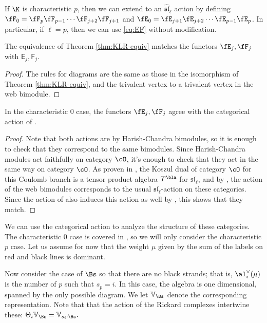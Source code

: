 If $\K$ is characteristic $p$, then we can extend to an
$\mathfrak{\widehat{sl}}_\ell$ action by defining
$\fF_0=\fF_{p}\fF_{p-1}\cdots \fF_{j+2}\fF_{j+1}$ and
$\fE_0=\fE_{j+1}\fE_{j+2}\cdots \fE_{p-1}\fE_{p}$.  In particular, if
$\ell=p$, then we can use \eqref{eq:EF} without modification.

\begin{proposition}
  The equivalence of Theorem \ref{thm:KLR-equiv} matches the functors
  $\fE_j,\fF_j$ with $\mathsf{E}_j,\mathsf{F}_j$.
\end{proposition}
\begin{proof}
  The rules for diagrams are the same as those in the isomorphism of
  Theorem \ref{thm:KLR-equiv}, and the trivalent vertex to a trivalent
  vertex in the web bimodule.
\end{proof}
\begin{proposition}\label{prop:char-0-match}
  In the characteristic 0 case, the functors $\fE_j,\fF_j$ agree with
  the categorical action of \cite{Webcatq}.  
\end{proposition}
\begin{proof}
Note that both actions are by Harish-Chandra bimodules, so it is
enough to check that they correspond to the same bimodules.  Since
Harish-Chandra modules act faithfully on category $\cO$, it's enough
to check that they act in the same way on category $\cO$.  As proven
in \cite{WebSD}, the Koszul dual of category $\cO$ for this Coulomb
branch is a tensor
  product algebra $T^\bla$ for $\mathfrak{sl}_\ell$, and by \cite{Webweb}, the action of the
  web bimodules corresponds to the usual $\mathfrak{sl}_\ell$-action
  on these categories.  Since the action of \cite{Webcatq} also
  induces this action as well by \cite{Webqui}, this shows that they match.
\end{proof}


We can use the categorical action to analyze the structure of these
categories.  The characteristic 0 case is covered in \cite{WebSD}, so
we will only consider the characteristic $p$ case.  
Let us assume for now that the weight $\mu$ given by the sum of the
labels on red and black lines is dominant.  

Now consider the case of $\Bs$ so that there are no black strands; that is, $\al_i^\vee(\mu)$ is the number of $p$ such that $s_p=i$. In this case, the algebra is one dimensional, spanned by the only possible diagram.  We let $\mathbb{V}_{\Bs}$ denote the corresponding representation.  Note that that the action of the Rickard complexes intertwine these: $\Theta_i\mathbb{V}_{\Bs}=\mathbb{V}_{s_i\cdot \Bs}.$

